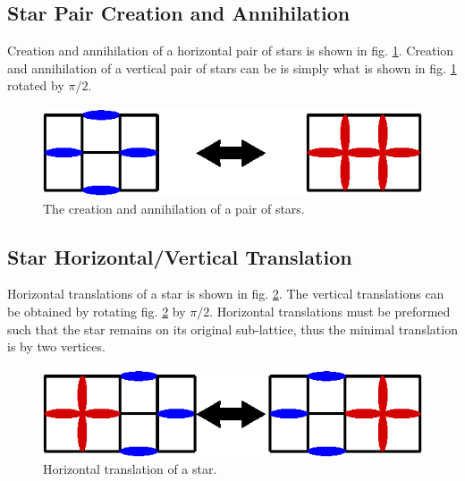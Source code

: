 \documentclass[aps,floatfix,11pt]{revtex4-1}
\begin{document}
\clearpage
\subsection{Star Pair Creation and Annihilation}

Creation and annihilation of a horizontal pair of stars is shown in fig.
\ref{fig:create_annihilate_pair}. Creation and annihilation of a vertical pair of stars can be
is simply what is shown in fig. \ref{fig:create_annihilate_pair} rotated by $\pi/2$.

\begin{figure}[h]
    \centering
    \includegraphics[width=8.5 cm]{create_annihilate_pair}
    \caption{The creation and annihilation of a pair of stars.
\label{fig:create_annihilate_pair}}
\end{figure}

\subsection{Star Horizontal/Vertical Translation}
Horizontal translations of a star is shown in fig. \ref{fig:move_right_left}. The vertical
translations can be obtained by rotating fig. \ref{fig:move_right_left} by $\pi/2$. Horizontal
translations must be preformed such that the star remains on its original sub-lattice, thus the
minimal translation is by two vertices.

\begin{figure}[h]
    \centering
    \includegraphics[width=8.5 cm]{move_right_left}
    \caption{Horizontal translation of a star.
\label{fig:move_right_left}}
\end{figure}
\end{document}
